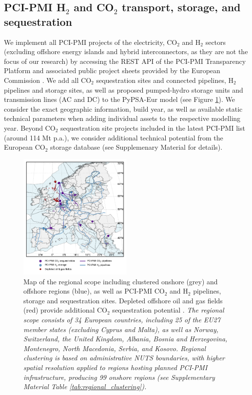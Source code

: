\documentclass[pdflatex,sn-nature]{sn-jnl}
\theoremstyle{thmstyleone}%
\theoremstyle{thmstyletwo}%
\theoremstyle{thmstylethree}%
\begin{document}
\subsection{PCI-PMI H$_2$ and CO$_2$ transport, storage, and sequestration}

We implement all PCI-PMI projects of the electricity, CO$_2$ and H$_2$ sectors (excluding offshore energy islands and hybrid interconnectors, as they are not the focus of our research) by accessing the REST API of the PCI-PMI Transparency Platform and associated public project sheets provided by the European Commission \cite{europeancommissionPCIPMITransparencyPlatform2024}. We add all CO$_2$ sequestration sites and connected pipelines, H$_2$ pipelines and storage sites, as well as proposed pumped-hydro storage units and transmission lines (AC and DC) to the PyPSA-Eur model (see Figure \ref{fig:regional_scope_map}). We consider the exact geographic information, build year, as well as available static technical parameters when adding individual assets to the respective modelling year. Beyond CO$_2$ sequestration site projects included in the latest PCI-PMI list (around 114 Mt p.a.), we consider additional technical potential from the European CO$_2$ storage database (see Supplemenary Material for details)\cite{europeancommissionEuropeanCO2Storage2020,hofmannH2CO2Network2025}. 

\begin{figure}[htbp]
  \centering
  \includegraphics[width=0.5\textwidth]{figures/map_adm_pcipmi}
  \caption{Map of the regional scope including clustered onshore (grey) and offshore regions (blue), as well as PCI-PMI CO$_2$ and H$_2$ pipelines, storage and sequestration sites. Depleted offshore oil and gas fields (red) provide additional CO$_2$ sequestration potential \cite{hofmannH2CO2Network2025}. \textit{The regional scope consists of 34 European countries, including 25 of the EU27 member states (excluding Cyprus and Malta), as well as Norway, Switzerland, the United Kingdom, Albania, Bosnia and Herzegovina, Montenegro, North Macedonia, Serbia, and Kosovo. Regional clustering is based on administrative NUTS boundaries, with higher spatial resolution applied to regions hosting planned PCI-PMI infrastructure, producing 99 onshore regions (see Supplementary Material Table \ref{tab:regional_clustering}).}}
  \label{fig:regional_scope_map}
\end{figure}
\end{document}
